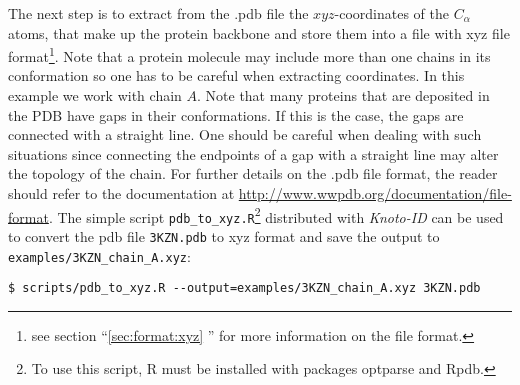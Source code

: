 The next step is to extract from the .pdb file the $xyz$-coordinates of the $C_\alpha$ atoms, that make up the protein backbone and store them into a file with xyz file format\footnote{see section ``\ref{sec:format:xyz} '' for more information on the file format.}. Note that a protein molecule may include more than one chains in its conformation so one has to be careful when extracting coordinates. In this example we work with chain $A$.
Note that many proteins that are deposited in the PDB have gaps in their conformations. If this is the case, the gaps are connected with a straight line. One should be careful when dealing with such situations since connecting the endpoints of a gap with a straight line may alter the topology of the chain.
For further details on the .pdb file format, the reader should refer to the documentation at \url{http://www.wwpdb.org/documentation/file-format}. The simple script \lstinline{pdb_to_xyz.R}\footnote{To use this script, {\ttfamily R}\cite{r2017} must be installed with packages {\ttfamily optparse}\cite{optparse} and {\ttfamily Rpdb}\cite{rpdb}.} distributed with {\it Knoto-ID} can be used to convert the pdb file \lstinline{3KZN.pdb} to xyz format and save the output to \lstinline{examples/3KZN_chain_A.xyz}:
\begin{lstlisting}
$ scripts/pdb_to_xyz.R --output=examples/3KZN_chain_A.xyz 3KZN.pdb
\end{lstlisting}

